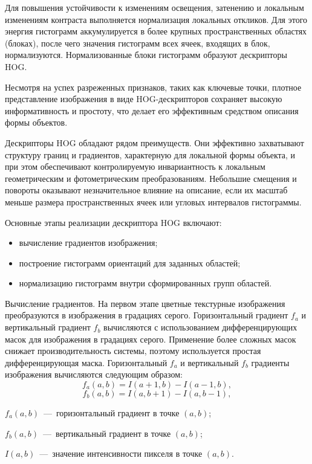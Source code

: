 Для повышения устойчивости к изменениям освещения, затенению и локальным изменениям контраста выполняется нормализация локальных откликов. Для этого энергия гистограмм аккумулируется в более крупных пространственных областях (блоках), после чего значения гистограмм всех ячеек, входящих в блок, нормализуются. Нормализованные блоки гистограмм образуют дескрипторы HOG.

Несмотря на успех разреженных признаков, таких как ключевые точки, плотное представление изображения в виде HOG-дескрипторов сохраняет высокую информативность и простоту, что делает его эффективным средством описания формы объектов.

Дескрипторы HOG обладают рядом преимуществ. Они эффективно захватывают структуру границ и градиентов, характерную для локальной формы объекта, и при этом обеспечивают контролируемую инвариантность к локальным геометрическим и фотометрическим преобразованиям. Небольшие смещения и повороты оказывают незначительное влияние на описание, если их масштаб меньше размера пространственных ячеек или угловых интервалов гистограммы.~\cite{ref1001}

Основные этапы реализации дескриптора HOG включают:
\begin{itemize}[label=---]
	\item вычисление градиентов изображения;
	\item построение гистограмм ориентаций для заданных областей;
	\item нормализацию гистограмм внутри сформированных групп областей.
\end{itemize}

Вычисление градиентов.
На первом этапе цветные текстурные изображения преобразуются в изображения в градациях серого. Горизонтальный градиент $f_a$ и вертикальный градиент $f_b$ вычисляются с использованием дифференцирующих масок для изображения в градациях серого. Применение более сложных масок снижает производительность системы, поэтому используется простая дифференцирующая маска. Горизонтальный $f_a$ и вертикальный $f_b$ градиенты изображения вычисляются следующим образом:
\begin{equation}
	f_a(a,b) = I(a+1,b) - I(a-1,b),
\end{equation}
\begin{equation}
	f_b(a,b) = I(a,b+1) - I(a,b-1),
\end{equation}
\begin{formulaexplanation}
	\item $f_a(a,b)$~---~горизонтальный градиент в точке $(a,b)$;
	\item $f_b(a,b)$~---~вертикальный градиент в точке $(a,b)$;
	\item $I(a,b)$~---~значение интенсивности пикселя в точке $(a,b)$.
\end{formulaexplanation}

